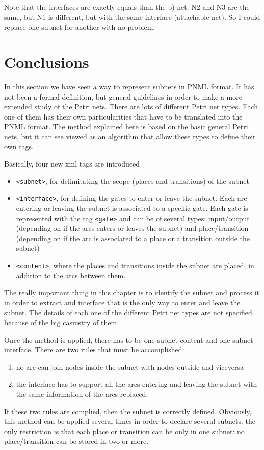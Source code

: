 Note that the interfaces are exactly equals than the b) net. N2 and N3 are
the same, but N1 is different, but with the same interface (attachable net). So I could replace one subnet for another with no problem.

\section{Conclusions}

In this section  we have seen a way to represent subnets in PNML format.
It has not been a formal definition, but general guidelines in order to make
a more extended study of the Petri nets. There are lots of different Petri net types. Each one of them has their own particularities that have to be translated into the PNML format. The method explained here is based on the
basic general Petri nets, but it can see viewed as an algorithm that allow these types to define their own tags. 

Basically, four new xml tags are introduced

\begin{itemize}
\item \texttt{<subnet>}, for delimitating the scope (places
and transitions) of the subnet
\item 
\texttt{<interface>}, for defining the gates to enter or leave the
subnet. Each arc entering or leaving the subnet is associated to a specific
gate. Each gate is represented with the tag \texttt{<gate>} and
can be of several types: input/output (depending on if the arcs enters or
leaves the subnet) and place/transition (depending on
if the arc is associated to a place or a transition outside the subnet)
\item \texttt{<content>}, where the places and transitions
inside the subnet are placed, in addition to the arcs between them. \end{itemize} 

The really important thing in this chapter is to identify the subnet and process it in order to extract and interface that is the only way to enter and leave the subnet. The details of each one of the different Petri net types are not specified because of the big casuistry of them.

Once the method is applied, there has to be one subnet content and one subnet interface. There are two rules that must be accomplished:

\begin{enumerate}
\item no arc can join nodes inside the subnet with nodes outside and viceversa
\item the interface has to support all the arcs entering and leaving the
subnet with the same information of the arcs replaced.  
\end{enumerate} If these two rules are complied, then the subnet is correctly
defined. Obviously, this method can be applied several times in order to declare several subnets. the only restriction is that each place or transition can be only in one subnet: no place/transition can be stored in two or more.  

